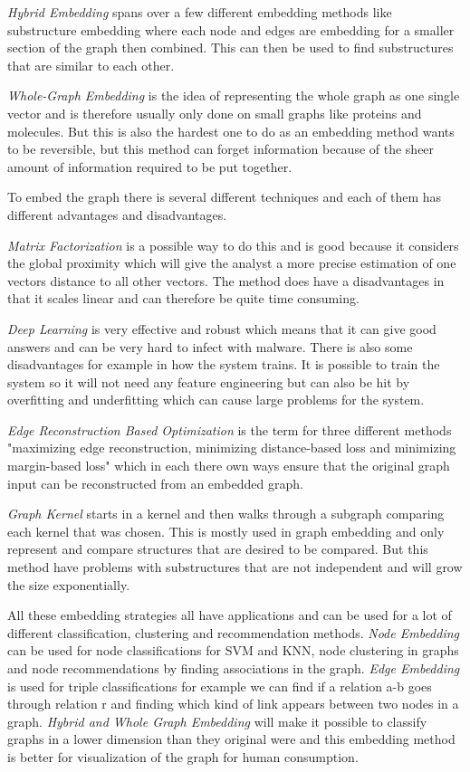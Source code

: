 \textit{Hybrid Embedding} spans over a few different embedding methods like substructure embedding where each node and edges are embedding for a smaller section of the graph then combined. This can then be used to find substructures that are similar to each other.

\textit{Whole-Graph Embedding} is the idea of representing the whole graph as one single vector and is therefore usually only done on small graphs like proteins and molecules. But this is also the hardest one to do as an embedding method wants to be reversible, but this method can forget information because of the sheer amount of information required to be put together.

To embed the graph there is several different techniques and each of them has different advantages and disadvantages.

\textit{Matrix Factorization} is a possible way to do this and is good because it considers the global proximity which will give the analyst a more precise estimation of one vectors distance to all other vectors. The method does have a disadvantages in that it scales linear and can therefore be quite time consuming.

\textit{Deep Learning} is very effective and robust which means that it can give good answers and can be very hard to infect with malware. There is also some disadvantages for example in how the system trains. It is possible to train the system so it will not need any feature engineering but can also be hit by overfitting and underfitting which can cause large problems for the system.

\textit{Edge Reconstruction Based Optimization} is the term for three different methods "maximizing edge reconstruction, minimizing distance-based loss and minimizing margin-based loss" which in each there own ways ensure that the original graph input can be reconstructed from an embedded graph.

\textit{Graph Kernel} starts in a kernel and then walks through a subgraph comparing each kernel that was chosen. This is mostly used in graph embedding and only represent and compare structures that are desired to be compared. But this method have problems with substructures that are not independent and will grow the size exponentially.

All these embedding strategies all have applications and can be used for a lot of different classification, clustering and recommendation methods. \textit{Node Embedding} can be used for node classifications for SVM and KNN, node clustering in graphs and node recommendations by finding associations in the graph. \textit{Edge Embedding} is used for triple classifications for example we can find if a relation a-b goes through relation r and finding which kind of link appears between two nodes in a graph. \textit{Hybrid and Whole Graph Embedding} will make it possible to classify graphs in a lower dimension than they original were and this embedding method is better for visualization of the graph for human consumption.
